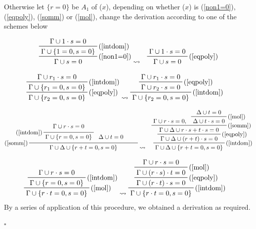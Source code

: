\documentclass[a4paper,12pt,oneside]{book}
\newcommand*{\QED}{\hfill\ensuremath{\square}}
\begin{document}
\noindent Otherwise let $\{r=0\}$ be $A_1$ of ($x$), depending on whether ($x$) is (\ref{non1=0}),(\ref{eqpoly}), (\ref{somm}) or (\ref{mol}), change the derivation according to one of the schemes below


\begin{eqnarray*}
\prftree[r]{(\ref{non1=0})} { \prftree[r]{(\ref{intdom})} {\Gamma \cup  1\cdot s=0 } {\Gamma \cup  \{1=0, s=0\}} } {\Gamma \cup s=0 }
&  \leadsto 
 &\prftree[r]{(\ref{eqpoly})} { \Gamma \cup 1\cdot s=0    } {\Gamma \cup s=0}
\end{eqnarray*}



\begin{eqnarray*}
\prftree[r]{(\ref{eqpoly})} { \prftree[r]{(\ref{intdom})} {\Gamma \cup  r_1\cdot s=0} {\Gamma \cup  \{r_1=0, s=0\}} } {\Gamma \cup \{r_2=0, s=0\}}
&  \leadsto 
\prftree[r]{(\ref{intdom})} { \prftree[r]{(\ref{eqpoly})} {\Gamma \cup  r_1\cdot s=0} {\Gamma \cup  r_2\cdot s=0} } {\Gamma \cup \{r_2=0, s=0\}}
\end{eqnarray*}


\begin{eqnarray*}
\prfrulenameskip=0.4em\prflinepadbefore=1ex
\prftree[l]{(\ref{somm})} { \prftree[l]{(\ref{intdom})} { \Gamma \cup  r\cdot s=0} { \Gamma \cup \{ r=0,s=0\} }  }{ \Delta \cup t=0 }
{\hspace{11mm}\Gamma \cup \Delta \cup\{r+t=0, s=0\}\hspace{11mm}}
& \leadsto
& \prftree[r]{(\ref{intdom})} 
{\prftree[r]{(\ref{eqpoly})}
{ 
\prftree[r]{(\ref{somm})}{\Gamma \cup r\cdot s=0,} 
{ \prftree[r]{(\ref{mol})} {\Delta \cup t=0  }  {\Delta \cup t\cdot s=0 }}
{\Gamma \cup \Delta \cup r\cdot s+t\cdot s=0 }
}
{\Gamma \cup \Delta \cup (r+t)\cdot s=0 }
}
{\Gamma \cup \Delta \cup\{r+t=0, s=0\}}
\end{eqnarray*}


\begin{eqnarray*}
\prftree[r]{(\ref{mol})} { \prftree[r]{(\ref{intdom})} {\Gamma \cup  r\cdot s=0} {\Gamma \cup  \{r=0, s=0\}} } {\Gamma \cup \{r\cdot t=0, s=0\}}
&  \leadsto 
\prftree[r]{(\ref{intdom})} 
{ \prftree[r]{(\ref{eqpoly})} 
{\prftree[r]{(\ref{mol})}
{\Gamma \cup r\cdot s=0}
{\Gamma\cup (r\cdot s) \cdot t=0 } } 
{\Gamma \cup  (r\cdot t) \cdot s=0} } 
{\Gamma \cup \{r\cdot t=0, s=0\}}
\end{eqnarray*}
By a series of application of this procedure, we obtained a derivation as required. 

\QED
\end{document}
